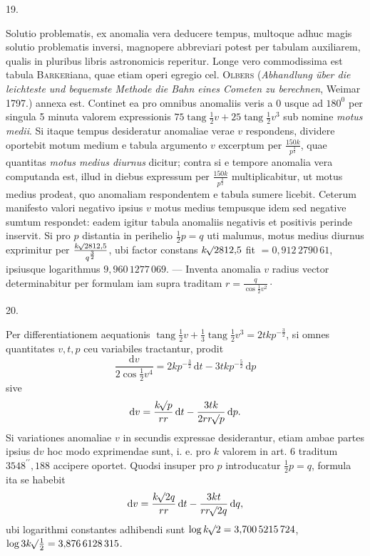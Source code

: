 \begin{center}
\hypertarget{native-037-article019}{}19.
\end{center}
Solutio problematis, ex anomalia vera deducere tempus, multoque adhuc magis solutio problematis inversi, magnopere abbreviari potest per tabulam auxiliarem, qualis in pluribus libris astronomicis reperitur. Longe vero commodissima est tabula \textsc{Barker}iana, quae etiam operi egregio cel. \textsc{Olbers} (\emph{Abhandlung über die leichteste und bequemste Methode die Bahn eines Cometen zu berechnen}, Weimar 1797.) annexa est. Continet ea pro omnibus anomaliis veris a 0 usque ad $180^0$ per singula 5 minuta valorem expressionis $75\operatorname{tang}\frac{1}{2}v+25\operatorname{tang}\frac{1}{2}v^3$ sub nomine \emph{motus medii}. Si itaque tempus desideratur anomaliae verae $v$ respondens, dividere oportebit motum medium e tabula argumento $v$ excerptum per $\frac{150k}{p^{\frac{3}{2}}}$, quae quantitas \emph{motus medius diurnus} dicitur; contra si e tempore anomalia vera computanda est, illud in diebus expressum per $\frac{150k}{p^{\frac{3}{2}}}$ multiplicabitur, ut motus medius prodeat, quo anomaliam respondentem e tabula sumere licebit. Ceterum manifesto valori negativo ipsius $v$ motus medius tempusque idem sed negative sumtum respondet: eadem igitur tabula anomaliis negativis et positivis perinde inservit. Si pro $p$ distantia in perihelio $\frac{1}{2}p=q$ uti malumus, motus medius diurnus exprimitur per $\frac{k\mathord{{}^{}\!\surd}2812{,}5}{q^{\frac{3}{2}}}$, ubi factor constans $k\mathord{{}^{}\!\surd}2812{,}5$ fit $=0{,}912\,2790\,61$, ipsiusque logarithmus $9{,}960\,1277\,069$. — Inventa anomalia $v$ radius vector determinabitur per formulam iam supra traditam $r=\frac{q}{\cos\frac{1}{2}v^2}\cdot$

\begin{center}
\hypertarget{native-037-article020}{}20.
\end{center}
Per differentiationem aequationis $\operatorname{tang}\frac{1}{2}v+\frac{1}{3}\operatorname{tang}\frac{1}{2}v^3=2t k p^{-\frac{3}{2}}$, si omnes quantitates $v,t,p$ ceu variabiles tractantur, prodit
\[
\frac{\mathrm{d}v}{2\cos\frac{1}{2}v^4}=2k p^{-\frac{3}{2}}\,\mathrm{d}t-3t k p^{-\frac{5}{2}}\,\mathrm{d}p
\]
sive
\[
\mathrm{d}v=\frac{k\mathord{{}^{}\!\surd}p}{r r}\,\mathrm{d}t-\frac{3t k}{2r r\mathord{{}^{}\!\surd}p}\,\mathrm{d}p.
\]
Si variationes anomaliae $v$ in secundis expressae desiderantur, etiam ambae partes ipsius $\mathrm{d}v$ hoc modo exprimendae sunt, i. e. pro $k$ valorem in art. 6 traditum $3548^{\prime\prime}{,}188$ accipere oportet. Quodsi insuper pro $p$ introducatur $\frac{1}{2}p=q$, formula ita se habebit
\[
\mathrm{d}v=\frac{k\mathord{{}^{}\!\surd}2q}{r r}\,\mathrm{d}t-\frac{3k t}{r r\mathord{{}^{}\!\surd}2q}\,\mathrm{d}q,
\]
ubi logarithmi constantes adhibendi sunt $\log k\mathord{{}^{}\!\surd}2=3{,}700\,5215\,724$,\\ $\log 3k\mathord{{}^{}\!\surd}\frac{1}{2}=3{,}876\,6128\,315$.

